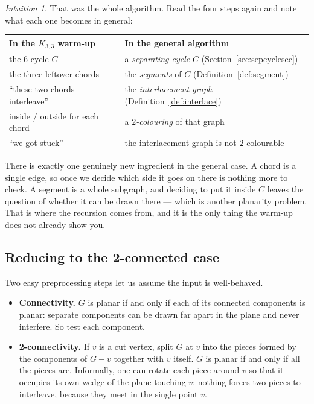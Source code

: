 \documentclass[11pt,a4paper]{article}
\theoremstyle{plain}
\theoremstyle{definition}
\theoremstyle{remark}
\newtheorem*{intuition}{Intuition}
\begin{document}
\begin{intuition}
That was the whole algorithm. Read the four steps again and note what each one
becomes in general:

\begin{center}
\begin{tabular}{@{}ll@{}}
\toprule
\textbf{In the $K_{3,3}$ warm-up} & \textbf{In the general algorithm} \\
\midrule
the $6$-cycle $C$ & a \emph{separating cycle} $C$
  (Section~\ref{sec:sepcyclesec}) \\
the three leftover chords & the \emph{segments} of $C$
  (Definition~\ref{def:segment}) \\
``these two chords interleave'' & the \emph{interlacement graph}
  (Definition~\ref{def:interlace}) \\
inside / outside for each chord & a \emph{$2$-colouring} of that graph \\
``we got stuck'' & the interlacement graph is not $2$-colourable \\
\bottomrule
\end{tabular}
\end{center}

There is exactly one genuinely new ingredient in the general case. A chord is
a single edge, so once we decide which side it goes on there is nothing more to
check. A segment is a whole subgraph, and deciding to put it inside $C$ leaves
the question of whether it can be drawn there --- which is another planarity
problem. That is where the recursion comes from, and it is the only thing the
warm-up does not already show you.
\end{intuition}

\subsection{Reducing to the 2-connected case}

Two easy preprocessing steps let us assume the input is well-behaved.

\begin{itemize}
  \item \textbf{Connectivity.} $G$ is planar if and only if each of its
        connected components is planar: separate components can be drawn far
        apart in the plane and never interfere. So test each component.
  \item \textbf{2-connectivity.} If $v$ is a cut vertex, split $G$ at $v$ into
        the pieces formed by the components of $G - v$ together with $v$
        itself. $G$ is planar if and only if all the pieces are. Informally,
        one can rotate each piece around $v$ so that it occupies its own wedge
        of the plane touching $v$; nothing forces two pieces to interleave,
        because they meet in the single point $v$.
\end{itemize}
\end{document}
